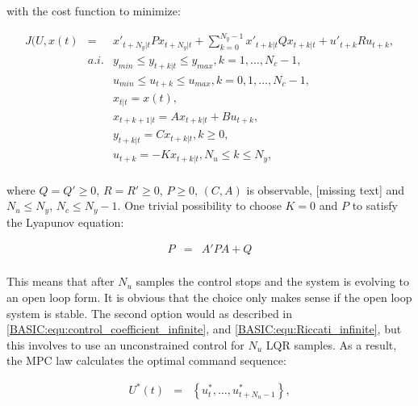 		
with the cost function to minimize:
		
		\begin{equation}
        \begin{array}{rcl}
				J(U,x(t)&=&x'_{t+N_y|t}Px_{t+N_y|t}+\sum^{N_y-1}_{k=0}x'_{t+k|t}Qx_{t+k|t}+u'_{t+k}Ru_{t+k},\\
				&a.i.&y_{min}\leq y_{t+k|t}\leq y_{max},k=1,\dots,N_c-1,\\
				&&u_{min}\leq u_{t+k}\leq u_{max},k=0,1,\dots,N_c-1,\\
				&&x_{t|t}=x(t),\\
				&&x_{t+k+1|t}=Ax_{t+k|t}+Bu_{t+k},\\
				&&y_{t+k|t}=Cx_{t+k|t}, k\geq0,\\
				&&u_{t+k}=-Kx_{t+k|t}, N_u\leq k\leq N_y,\\
        \end{array}
        \label{BASIC:equ:receiding_horison_problem}
    \end{equation}
		
		where $Q=Q'\geq0$, $R=R'\geq0$, $P\geq0$, $(C,A)$ is observable, [missing text] and $N_u\leq N_y$, $N_c\leq N_y-1$. One trivial possibility to choose $K=0$ and $P$ to satisfy the Lyapunov equation:
		
		\begin{equation}
        \begin{array}{rcl}
				P&=&A'PA+Q\\
        \end{array}
        \label{BASIC:equ:receiding_horison_Lyapunov}
    \end{equation}
		
		This means that after $N_u$ samples the control stops and the system is evolving to an open loop form. It is obvious that the choice only makes sense if the open loop system is stable. The second option would as described in \ref{BASIC:equ:control_coefficient_infinite}, and \ref{BASIC:equ:Riccati_infinite}, but this involves to use an unconstrained control for $N_u$ LQR samples. As a result, the MPC law calculates the optimal command sequence:
		
		\begin{equation}
        \begin{array}{rcl}
				U^*(t)&=&\left\{u^*_t,\dots,u^*_{t+N_u-1}\right\},\\
        \end{array}
        \label{BASIC:equ:receiding_optimal_sequence}
    \end{equation}
		
